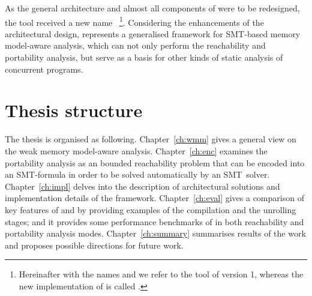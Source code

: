 As the general architecture and almost all components of \porthos{} were to be redesigned, the tool received a new name \textit{\porthos[2]}\,%
%
\footnote{Hereinafter with the names \textit{\porthos{}} and \textit{\porthos[1]} we refer to the tool \porthos{} of version 1, whereas the new implementation of \porthos{} is called \textit{\porthos[2]}.}. %
%
Considering the enhancements of the architectural design, \porthos[2] represents a generalised framework for SMT-based memory model-aware analysis, which can not only perform the reachability and portability analysis, but serve as a basis for other kinds of static analysis of concurrent programs.


\section{Thesis structure}
\label{ch:intro:structure}

The thesis is organised as following.
Chapter~\ref{ch:wmm} gives a general view on the weak memory model-aware analysis.
Chapter~\ref{ch:enc} examines the portability analysis as an bounded reachability problem that can be encoded into an SMT-formula in order to be solved automatically by an SMT~solver.
Chapter~\ref{ch:impl} delves into the description of architectural solutions and implementation details of the \porthos[2] framework.
Chapter~\ref{ch:eval} gives a comparison of key features of \porthos[2] and \porthos[1] by providing examples of the compilation and the unrolling stages; and it provides some performance benchmarks of \porthos[2] in both reachability and portability analysis modes.
Chapter~\ref{ch:summary} summarises results of the work and proposes possible directions for future work.
